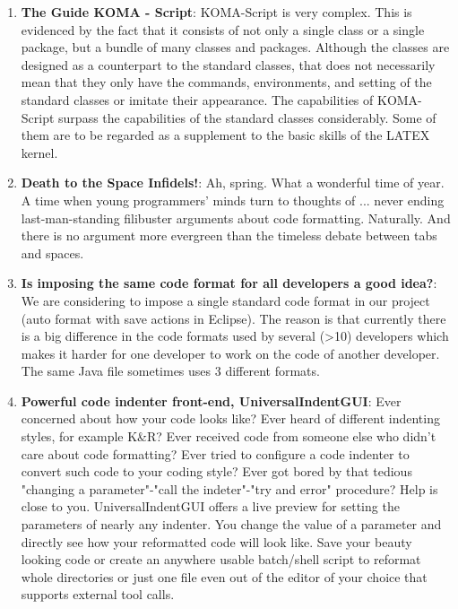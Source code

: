 \begin{englishtext}
\begin{enumerate}
    \item \textbf{The Guide KOMA - Script}: KOMA-Script  is very complex. This
    is evidenced by the fact that it consists of not only a single class or a
    single package, but a bundle of many classes and packages. Although the
    classes are designed as a counterpart to the standard classes, that does not
    necessarily mean that they only have the commands, environments, and setting
    of the standard classes or imitate their appearance. The capabilities of
    KOMA-Script surpass the capabilities of the standard classes considerably.
    Some of them are to be regarded as a supplement to the basic skills of the
    LATEX kernel. \cite{komaScrguien}

    \item \textbf{Death to the Space Infidels!}: Ah, spring. What a wonderful time of
    year. A time when young programmers' minds turn to thoughts of ... never
    ending last-man-standing filibuster arguments about code formatting.
    Naturally. And there is no argument more evergreen than the timeless debate
    between tabs and spaces. \cite{Atwood}

    \item \textbf{Is imposing the same code format for all developers a good
    idea?}: We are considering to impose a single standard code format in our
    project (auto format with save actions in Eclipse). The reason is that
    currently there is a big difference in the code formats used by several
    (>10) developers which makes it harder for one developer to work on the code
    of another developer. The same Java file sometimes uses 3 different formats.
    \cite{Geukens}

    \item \textbf{Powerful code indenter front-end, UniversalIndentGUI}: Ever
    concerned about how your code looks like? Ever heard of different indenting
    styles, for example K\&R? Ever received code from someone else who didn't
    care about code formatting? Ever tried to configure a code indenter to
    convert such code to your coding style? Ever got bored by that tedious
    "changing a parameter"-"call the indeter"-"try and error" procedure? Help is
    close to you. UniversalIndentGUI offers a live preview for setting the
    parameters of nearly any indenter. You change the value of a parameter and
    directly see how your reformatted code will look like. Save your beauty
    looking code or create an anywhere usable batch/shell script to reformat
    whole directories or just one file even out of the editor of your choice
    that supports external tool calls. \cite{Schweitzer}


\end{enumerate}
\end{englishtext}
